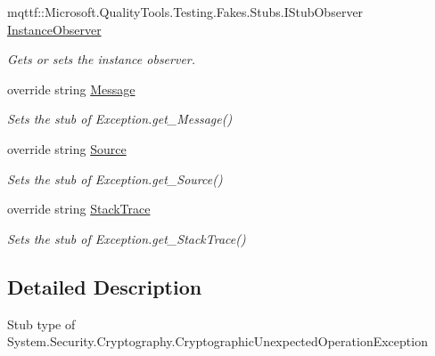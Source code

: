 \begin{DoxyCompactItemize}
mqttf\-::\-Microsoft.\-Quality\-Tools.\-Testing.\-Fakes.\-Stubs.\-I\-Stub\-Observer \hyperlink{class_system_1_1_security_1_1_cryptography_1_1_fakes_1_1_stub_cryptographic_unexpected_operation_exception_a50fa472e9119b71927b683351ea0ca58}{Instance\-Observer}
\begin{DoxyCompactList}\small\item\em Gets or sets the instance observer.\end{DoxyCompactList}\item 
override string \hyperlink{class_system_1_1_security_1_1_cryptography_1_1_fakes_1_1_stub_cryptographic_unexpected_operation_exception_a0906256a104f00caaca7c4b3fc34de5e}{Message}
\begin{DoxyCompactList}\small\item\em Sets the stub of Exception.\-get\-\_\-\-Message()\end{DoxyCompactList}\item 
override string \hyperlink{class_system_1_1_security_1_1_cryptography_1_1_fakes_1_1_stub_cryptographic_unexpected_operation_exception_a8462caeb9f0552f55eb74394362f0e9c}{Source}
\begin{DoxyCompactList}\small\item\em Sets the stub of Exception.\-get\-\_\-\-Source()\end{DoxyCompactList}\item 
override string \hyperlink{class_system_1_1_security_1_1_cryptography_1_1_fakes_1_1_stub_cryptographic_unexpected_operation_exception_a6d1cd0be3e1a1183f007a2b4980817f3}{Stack\-Trace}
\begin{DoxyCompactList}\small\item\em Sets the stub of Exception.\-get\-\_\-\-Stack\-Trace()\end{DoxyCompactList}\end{DoxyCompactItemize}


\subsection{Detailed Description}
Stub type of System.\-Security.\-Cryptography.\-Cryptographic\-Unexpected\-Operation\-Exception



